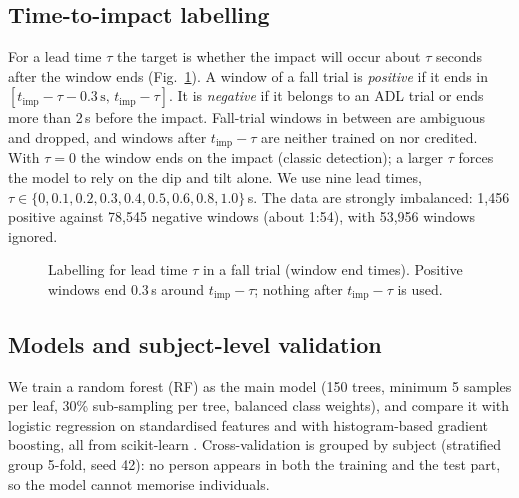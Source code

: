 \documentclass[conference]{IEEEtran}
\begin{document}
\subsection{Time-to-impact labelling}
For a lead time $\tau$ the target is whether the impact will occur about $\tau$ seconds after the window ends (Fig.~\ref{fig:timeline}). A window of a fall trial is \emph{positive} if it ends in $[t_{\mathrm{imp}}-\tau-0.3\,\mathrm{s},\,t_{\mathrm{imp}}-\tau]$. It is \emph{negative} if it belongs to an ADL trial or ends more than 2\,s before the impact. Fall-trial windows in between are ambiguous and dropped, and windows after $t_{\mathrm{imp}}-\tau$ are neither trained on nor credited. With $\tau=0$ the window ends on the impact (classic detection); a larger $\tau$ forces the model to rely on the dip and tilt alone. We use nine lead times, $\tau\in\{0,0.1,0.2,0.3,0.4,0.5,0.6,0.8,1.0\}$\,s. The data are strongly imbalanced: 1{,}456 positive against 78{,}545 negative windows (about 1:54), with 53{,}956 windows ignored.

\begin{figure}[t]
\centering
{}
\caption{Labelling for lead time $\tau$ in a fall trial (window end times). Positive windows end 0.3\,s around $t_{\mathrm{imp}}-\tau$; nothing after $t_{\mathrm{imp}}-\tau$ is used.}
\label{fig:timeline}
\end{figure}

\subsection{Models and subject-level validation}
We train a random forest (RF) \cite{breiman2001} as the main model (150 trees, minimum 5 samples per leaf, 30\% sub-sampling per tree, balanced class weights), and compare it with logistic regression on standardised features and with histogram-based gradient boosting, all from scikit-learn \cite{pedregosa2011}. Cross-validation is grouped by subject (stratified group 5-fold, seed 42): no person appears in both the training and the test part, so the model cannot memorise individuals.
\end{document}
